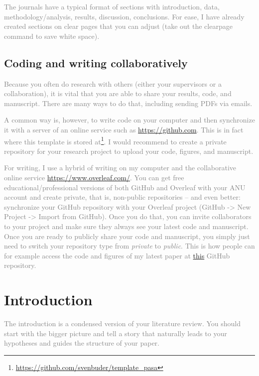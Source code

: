 \documentclass[
  journal=pasa,
  manuscript=Research-Article,
  year=2025,
  volume=X,
]{cup-journal}
\newcommand{\comment}[1]{\textcolor{gray}{#1}}
\begin{document}
\comment{The journals have a typical format of sections with introduction, data, methodology/analysis, results, discussion, conclusions. For ease, I have already created sections on clear pages that you can adjust (take out the clearpage command to save white space).}

\subsection{Coding and writing collaboratively}

\comment{Because you often do research with others (either your supervisors or a collaboration), it is vital that you are able to share your results, code, and manuscript. There are many ways to do that, including sending PDFs via emails.}

\comment{A common way is, however, to write code on your computer and then synchronize it with a server of an online service such as \url{https://github.com}. This is in fact where this template is stored at\footnote{\url{https://github.com/svenbuder/template_pasa}}. I would recommend to create a private repository for your research project to upload your code, figures, and manuscript.}

\comment{For writing, I use a hybrid of writing on my computer and the collaborative online service \url{https://www.overleaf.com/}. You can get free educational/professional versions of both GitHub and Overleaf with your ANU account and create private, that is, non-public repositories -- and even better: synchronize your GitHub repository with your Overleaf project (GitHub -> New Project -> Import from GitHub). Once you do that, you can invite collaborators to your project and make sure they always see your latest code and manuscript. Once you are ready to publicly share your code and manuscript, you simply just need to switch your repository type from \textit{private} to \textit{public}. This is how people can for example access the code and figures of my latest paper \citep{Buder2024} at \href{https://github.com/svenbuder/Accretion_Clues_ObsSim}{this} GitHub repository.}

\clearpage
\section{Introduction}
\label{sec:introduction}

\comment{The introduction is a condensed version of your literature review. You should start with the bigger picture and tell a story that naturally leads to your hypotheses and guides the structure of your paper.}
\end{document}
